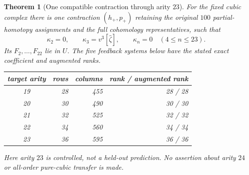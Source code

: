 \documentclass[11pt]{amsart}
\newtheorem{theorem}{Theorem}[section]
\begin{document}
\begin{theorem}[One compatible contraction through arity $23$]
\label{thm:compatible-23}
For the fixed cubic complex there is one contraction $(h_+,p_+)$ retaining
the original $100$ partial-homotopy assignments and the full cohomology
representatives, such that
\[
\boxed{\kappa_2=0,\qquad
\kappa_3=v^3[\widehat\zeta],\qquad
\kappa_n=0\quad(4\le n\le23).}
\]
Its $F_2,\ldots,F_{22}$ lie in $U$. The five feedback systems below have the
stated exact coefficient and augmented ranks.
\begin{center}
\begin{tabular}{@{}crrr@{}}
\toprule
target arity & rows & columns & rank / augmented rank\\
\midrule
19&28&455&28 / 28\\
20&30&490&30 / 30\\
21&32&525&32 / 32\\
22&34&560&34 / 34\\
23&36&595&36 / 36\\
\bottomrule
\end{tabular}
\end{center}
Here arity $23$ is controlled, not a held-out prediction.
No assertion about arity $24$ or all-order pure-cubic transfer is made.
\end{theorem}
\end{document}
